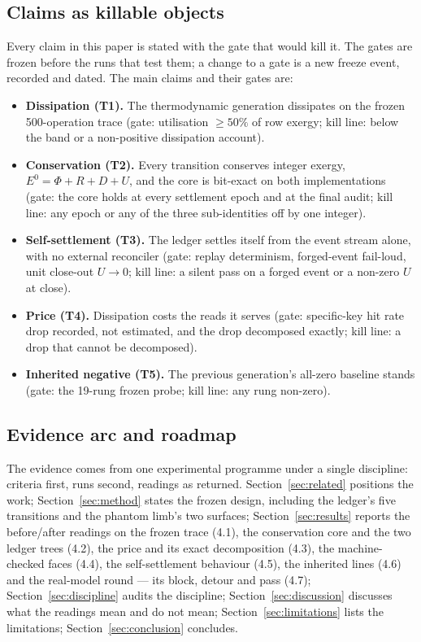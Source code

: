 \documentclass[11pt,a4paper]{article}
\newcommand{\Ezero}{E^{0}}
\begin{document}
\subsection{Claims as killable objects}
Every claim in this paper is stated with the gate that would kill it. The gates are frozen before the runs that test them; a change to a gate is a new freeze event, recorded and dated. The main claims and their gates are:
\begin{itemize}\setlength\itemsep{1pt}
\item \textbf{Dissipation (T1).} The thermodynamic generation dissipates on the frozen 500-operation trace (gate: utilisation $\ge 50\%$ of row exergy; kill line: below the band or a non-positive dissipation account).
\item \textbf{Conservation (T2).} Every transition conserves integer exergy, $\Ezero = \Phi+R+D+U$, and the core is bit-exact on both implementations (gate: the core holds at every settlement epoch and at the final audit; kill line: any epoch or any of the three sub-identities off by one integer).
\item \textbf{Self-settlement (T3).} The ledger settles itself from the event stream alone, with no external reconciler (gate: replay determinism, forged-event fail-loud, unit close-out $U \to 0$; kill line: a silent pass on a forged event or a non-zero $U$ at close).
\item \textbf{Price (T4).} Dissipation costs the reads it serves (gate: specific-key hit rate drop recorded, not estimated, and the drop decomposed exactly; kill line: a drop that cannot be decomposed).
\item \textbf{Inherited negative (T5).} The previous generation's all-zero baseline stands (gate: the 19-rung frozen probe; kill line: any rung non-zero).
\end{itemize}

\subsection{Evidence arc and roadmap}
The evidence comes from one experimental programme under a single discipline: criteria first, runs second, readings as returned. Section~\ref{sec:related} positions the work; Section~\ref{sec:method} states the frozen design, including the ledger's five transitions and the phantom limb's two surfaces; Section~\ref{sec:results} reports the before/after readings on the frozen trace (4.1), the conservation core and the two ledger trees (4.2), the price and its exact decomposition (4.3), the machine-checked faces (4.4), the self-settlement behaviour (4.5), the inherited lines (4.6) and the real-model round --- its block, detour and pass (4.7); Section~\ref{sec:discipline} audits the discipline; Section~\ref{sec:discussion} discusses what the readings mean and do not mean; Section~\ref{sec:limitations} lists the limitations; Section~\ref{sec:conclusion} concludes.
\end{document}
